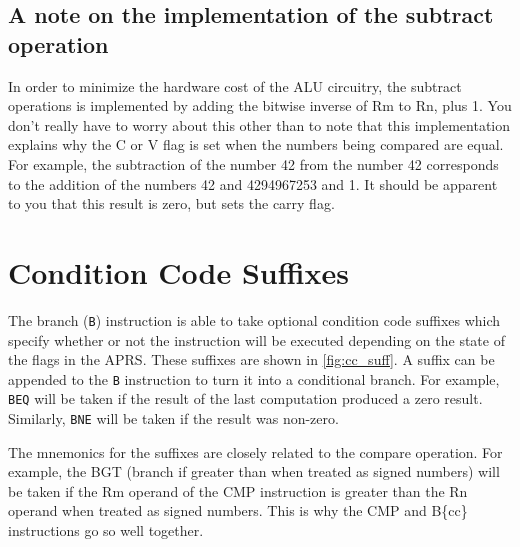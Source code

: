 \subsection{A note on the implementation of the subtract operation}
In order to minimize the hardware cost of the ALU circuitry, the subtract operations is implemented by adding the bitwise inverse of Rm to Rn, plus 1. You don't really have to worry about this other than to note that this implementation explains why the C or V flag is set when the numbers being compared are equal. For example, the subtraction of the number 42 from the number 42 corresponds to the addition of the numbers 42 and 4294967253 and 1. It should be apparent to you that this result is zero, but sets the carry flag. 


\section{Condition Code Suffixes} 
The branch (\texttt{B}) instruction is able to take optional condition code suffixes which specify whether or not the instruction will be executed depending on the state of the flags in the APRS. 
These suffixes are shown in \autoref{fig:cc_suff}. A suffix can be appended to the \texttt{B} instruction to turn it into a conditional branch. For example, \texttt{BEQ} will be taken if the result of the last computation produced a zero result. Similarly, \texttt{BNE} will be taken if the result was non-zero. 

The mnemonics for the suffixes are closely related to the compare operation. For example, the BGT (branch if greater than when treated as signed numbers) will be taken if the Rm operand of the CMP instruction is greater than the Rn operand when treated as signed numbers. This is why the CMP and B\{cc\}  instructions go so well together.

